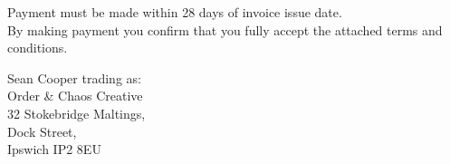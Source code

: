 \documentclass[11pt,a4paper]{letter}
\begin{document}
    \fontsize{7pt}{9pt}\selectfont
    {\semibold Payment must be made within 28 days of invoice issue date.}\\
    By making payment you confirm that you fully accept the attached terms and conditions.\par
    \vspace*{\fill}
    \begin{center}
    {\fontsize{7pt}{9pt}\selectfont
    Sean Cooper trading as:\\
    {\semiboldit Order \& Chaos Creative}\\
    32 Stokebridge Maltings,\\
    Dock Street,\\
    Ipswich IP2 8EU\\}
    \end{center}
\end{document}
